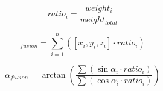 \documentclass{styles/svproc}
\begin{document}
	\begin{equation}
	ratio_{i} = \frac{weight_{i}}{weight_{total}}
	\label{eq:ratio}
	\end{equation}
	
	\begin{equation}
	[x,y,z]_{fusion} = \sum_{i=1}^{n} ([x_{i},y_{i},z_{i}] \cdot ratio_{i})
	\label{eq:xyzfusion}
	\end{equation}
	
	\begin{equation}
	\alpha_{fusion} = \arctan \left( \frac{ \sum ( \sin \alpha_{i} \cdot ratio_{i} ) }{ \sum ( \cos \alpha_{i} \cdot ratio_{i} ) } \right)
	\label{eq:alphafusion}
	\end{equation}
	
	

	
	
	
	
	
\end{document}
